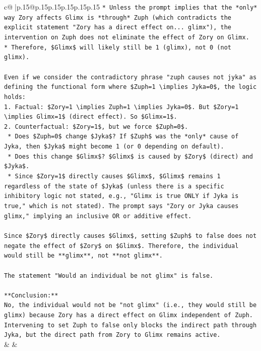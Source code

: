 \documentclass{article}
\begin{document}
{\begin{supertabular}{c@{$\;$}|p{.15\linewidth}@{}p{.15\linewidth}p{.15\linewidth}p{.15\linewidth}p{.15\linewidth}p{.15\linewidth}}
{{{\texttt{*   Unless the prompt implies that the *only* way Zory affects Glimx is *through* Zuph (which contradicts the explicit statement "Zory has a direct effect on... glimx"), the intervention on Zuph does not eliminate the effect of Zory on Glimx.} \\
\texttt{*   Therefore, \$Glimx\$ will likely still be 1 (glimx), not 0 (not glimx).} \\
\\ 
\texttt{Even if we consider the contradictory phrase "zuph causes not jyka" as defining the functional form where \$Zuph=1 \textbackslash{}implies Jyka=0\$, the logic holds:} \\
\texttt{1.  Factual: \$Zory=1 \textbackslash{}implies Zuph=1 \textbackslash{}implies Jyka=0\$. But \$Zory=1 \textbackslash{}implies Glimx=1\$ (direct effect). So \$Glimx=1\$.} \\
\texttt{2.  Counterfactual: \$Zory=1\$, but we force \$Zuph=0\$.} \\
\texttt{    *   Does \$Zuph=0\$ change \$Jyka\$? If \$Zuph\$ was the *only* cause of Jyka, then \$Jyka\$ might become 1 (or 0 depending on default).} \\
\texttt{    *   Does this change \$Glimx\$? \$Glimx\$ is caused by \$Zory\$ (direct) and \$Jyka\$.} \\
\texttt{    *   Since \$Zory=1\$ directly causes \$Glimx\$, \$Glimx\$ remains 1 regardless of the state of \$Jyka\$ (unless there is a specific inhibitory logic not stated, e.g., "Glimx is true ONLY if Jyka is true," which is not stated). The prompt says "Zory or Jyka causes glimx," implying an inclusive OR or additive effect.} \\
\\ 
\texttt{Since \$Zory\$ directly causes \$Glimx\$, setting \$Zuph\$ to false does not negate the effect of \$Zory\$ on \$Glimx\$. Therefore, the individual would still be **glimx**, not **not glimx**.} \\
\\ 
\texttt{The statement "Would an individual be not glimx" is false.} \\
\\ 
\texttt{**Conclusion:**} \\
\texttt{No, the individual would not be "not glimx" (i.e., they would still be glimx) because Zory has a direct effect on Glimx independent of Zuph. Intervening to set Zuph to false only blocks the indirect path through Jyka, but the direct path from Zory to Glimx remains active.} \\
            }
        }
    }
    & & \\ \\


\end{supertabular}}
\end{document}
